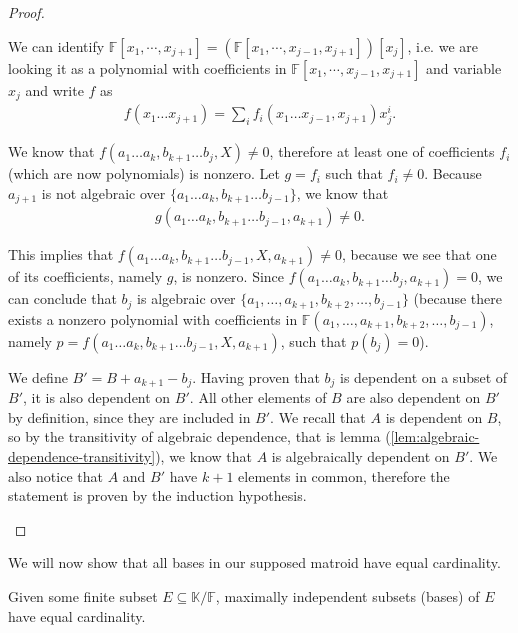 \begin{proof}
\begin{enumerate}
		      We can identify $\mathbb{F}[x_1,\cdots,x_{j+1}] = (\mathbb{F}[x_1,\cdots, x_{j-1}, x_{j+1}])[x_j]$, i.e. we are looking it as a polynomial with coefficients in  $\mathbb{F}[x_1,\cdots, x_{j-1}, x_{j+1}]$ and variable $x_j$ and write $f$ as
		      \begin{align*}
			      f(x _1 \ldots x _{j + 1})
			      = \sum_i f _i(x _1 \ldots x _{j - 1}, x _{j + 1}) x _j ^i.
		      \end{align*}

		      We know that $f(a _1 \ldots a _{k}, b _{k + 1} \ldots b _{j}, X) \neq  0$, therefore at least one of coefficients $f _i $ (which are now polynomials) is nonzero. Let $g = f _i $ such that $f _i \neq 0$. Because $a _{j + 1}$ is not algebraic over $\{a _1 \ldots a _k, b _{k + 1} \ldots b _{j - 1}\}$, we know that
		      \begin{align*}
			      g(a _1 \ldots a _k, b _{k + 1} \ldots b _{j - 1}, a _{k + 1}) \neq 0.
		      \end{align*}

		      This implies that $f(a _1 \ldots a _k, b _{k + 1} \ldots b _{j - 1}, X, a _{k + 1}) \neq 0$, because we see that one of its coefficients, namely $g$, is nonzero. Since $ f(a _1 \ldots a _{k}, b _{k + 1} \ldots b _{j}, a _{k + 1})  = 0$, we can conclude that $b_j$ is algebraic over $\{a _1, \ldots, a _{k + 1}, b _{k + 2} ,\ldots,b_{j-1}\}$ (because there exists a nonzero polynomial with coefficients in $\mathbb{F}(a _1, \ldots, a _{k + 1}, b _{k + 2} ,\ldots,b_{j-1})$, namely $p = f(a _1 \ldots a _k, b _{k + 1} \ldots b _{j - 1}, X, a _{k + 1})$, such that $p(b_j) = 0$).

		We define $B' = B + a _{k + 1} - b_j$. Having proven that $b_j$ is dependent on a subset of $B'$, it is also dependent on $B'$. All other elements of $B$ are also dependent on $B'$ by definition, since they are included in $B'$. We recall that $A$ is dependent on $B$, so by the transitivity of algebraic dependence, that is lemma (\ref{lem:algebraic-dependence-transitivity}), we know that $A$ is algebraically dependent on $B'$. We also notice that $A$ and $B'$ have $k + 1$ elements in common, therefore the statement is proven by the induction hypothesis.
	\end{enumerate}
\end{proof}

We will now show that all bases in our supposed matroid have equal cardinality.

\begin{lemma}\label{lem:algebraic-matroid-equal-size-bases}
	Given some finite subset $E \subseteq \mathbb K / \mathbb F$, maximally independent subsets (bases) of $E$ have equal cardinality.
\end{lemma}


